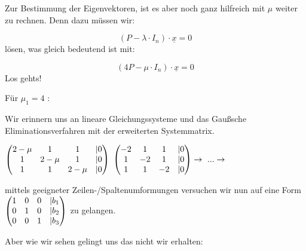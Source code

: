 \begin{uebsp}
\begin{Answer}
{
Zur Bestimmung der Eigenvektoren, ist es aber noch ganz hilfreich mit 
$\mu $ weiter zu rechnen. Denn dazu m\"ussen wir:}

\begin{equation*}
(P-\lambda \cdot I_{n})\cdot \underline{{x}}=0
\end{equation*}
{
l\"osen, was gleich bedeutend ist mit:}



\begin{equation*}
(4P-\mu \cdot I_{n})\cdot \underline{{x}}=0
\end{equation*}
{
Los gehts!}



{
F\"ur  $\mu _{1}=4$ :}







{
Wir erinnern uns an lineare Gleichungssysteme und das
Gau{\ss}{\textquotesingle}sche Eliminationsverfahren mit der
erweiterten Systemmatrix.}



{
 $\left(\begin{matrix}2-\mu &1&1&\text{{\textbar}}0\\1&2-\mu
&1&\text{{\textbar}}0\\1&1&2-\mu
&\text{{\textbar}}0\end{matrix}\right)$  
$\left(\begin{matrix}-2&1&1&\text{{\textbar}}0\\1&-2&1&\text{{\textbar}}0\\1&1&-2&\text{{\textbar}}0\end{matrix}\right)\rightarrow
\text{ ...}\rightarrow $ }

{
mittels geeigneter Zeilen-/Spaltenumformungen versuchen wir nun auf eine
Form 
$\left(\begin{matrix}1&0&0&\text{{\textbar}}b_{1}\\0&1&0&\text{{\textbar}}b_{2}\\0&0&1&\text{{\textbar}}b_{3}\end{matrix}\right)$
 zu gelangen.}

{
Aber wie wir sehen gelingt uns das nicht wir erhalten:}




\end{Answer}
\end{uebsp}
